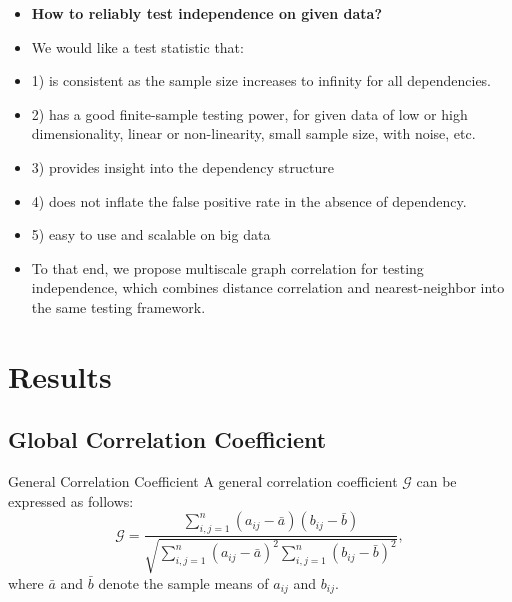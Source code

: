 \documentclass{beamer}
\newcommand{\G}{\mathcal{G}}
\begin{document}
\begin{frame}
\begin{itemize}[<+->]
\item \textbf{How to reliably test independence on given data?}
\item We would like a test statistic that:
\item 1) is consistent as the sample size increases to infinity for all dependencies.
\item 2) has a good finite-sample testing power, for given data of low or high dimensionality, linear or non-linearity, small sample size, with noise, etc.
\item 3) provides insight into the dependency structure
\item 4) does not inflate the false positive rate in the absence of dependency.
\item 5) easy to use and scalable on big data
\item To that end, we propose multiscale graph correlation \cite{ShenEtAl2016} for testing independence, which combines distance correlation and nearest-neighbor into the same testing framework.
\end{itemize}
\end{frame}

\section{Results}
\subsection{Global Correlation Coefficient}
\begin{frame}{General Correlation Coefficient}
A general correlation coefficient $\G$ can be expressed as follows:
\begin{equation}
\label{generalCoef}
\G=\frac{\sum_{i,j=1}^n (a_{ij}-\bar{a}) (b_{ij}-\bar{b})}{\sqrt{\sum_{i,j=1}^n  (a_{ij}-\bar{a})^{2} \sum_{i,j=1}^n (b_{ij}-\bar{b})^{2}}}, 
\end{equation}
where $\bar{a}$ and $\bar{b}$ denote the sample means of $a_{ij}$ and $b_{ij}$.
\end{frame}
\end{document}
